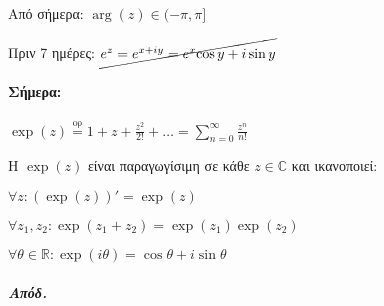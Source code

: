\documentclass[12pt,a4paper,titlepage,fleqn]{article}
\begin{document}
    \subsection{}
    Από σήμερα: \( \arg(z) \in (-\pi,\pi] \)

    Πριν 7 ημέρες: \( \cancel{e^z=e^{x+iy}=e^x{\cos y+i\sin y}} \)

    \paragraph{Σήμερα:} \( \exp(z) \overset{\text{ορ}}{=}
    1+z+\frac{z^2}{2!}+\dots=\sum_{n=0}^\infty \frac{z^n}{n!} \)

    \begin{theorem*}{}
    	Η \( \exp(z) \) είναι παραγωγίσιμη σε κάθε \( z\in\mathbb C  \)
    	και ικανοποιεί:
    	\begin{enumparen}
    		\item \( \forall z: \left(\exp(z)\right)' = \exp(z) \)
    		\item \( \forall z_1,z_2:\exp(z_1+z_2)=\exp(z_1)\exp(z_2) \)
    		\item \( \forall \theta\in\mathbb R
    		:\exp(i\theta)=\cos\theta+i\sin\theta \)
    	\end{enumparen}
    \end{theorem*}
    \subparagraph{Απόδ.}
\end{document}
